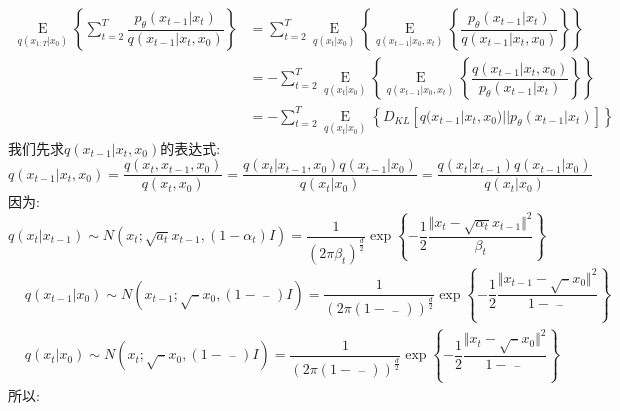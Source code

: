 \documentclass[withoutpreface,bwprint]{cumcmthesis} %
\begin{document}
		\begin{align*}
			\mathop{E}\limits_{ q(x_{1:T}|x_0) } \left\{  
			\sum_{t=2}^{T} \dfrac{p_{\theta}(x_{t-1}|x_{t})}{q(x_{t-1}|x_t,x_0)}
			\right\} & = 
			\sum_{t=2}^{T}
			\mathop{E}\limits_{ q(x_{t}|x_0) } \left\{
			\mathop{E}\limits_{ q(x_{t-1}|x_0,x_t) } \left\{  
			 \dfrac{p_{\theta}(x_{t-1}|x_{t})}{q(x_{t-1}|x_t,x_0)}
			\right\}
			\right\} 	\\
			& =
			- \sum_{t=2}^{T}
			\mathop{E}\limits_{ q(x_{t}|x_0) } \left\{
			\mathop{E}\limits_{ q(x_{t-1}|x_0,x_t) } \left\{  
			\dfrac{ q(x_{t-1}|x_t,x_0)}{p_{\theta}(x_{t-1}|x_{t})}
			\right\}
			\right\} 	\\
			& =	- \sum_{t=2}^{T}
			\mathop{E}\limits_{ q(x_{t}|x_0) } \left\{
				D_{KL}\left[ q(x_{t-1}|x_t,x_0)||p_{\theta}(x_{t-1}|x_{t})\right]
			\right\} 
		\end{align*}
	我们先求$q(x_{t-1}|x_t,x_0)$的表达式:
	$$
		q(x_{t-1}|x_t,x_0)=\dfrac{q(x_t,x_{t-1},x_0)}{q(x_t,x_0)}=\dfrac{q(x_t|x_{t-1},x_0) q(x_{t-1}|x_0)}{q(x_t|x_0)}=\dfrac{q(x_t|x_{t-1}) q(x_{t-1}|x_0)}{q(x_t|x_0)}
	$$
	因为:
	$$
	q(x_t|x_{t-1})  \sim N\left(x_t;\sqrt{a_t} x_{t-1},(1-\alpha_{t})I \right)=\dfrac{1}{\left( 2\pi\beta_{t} \right)^{\frac{d}{2}}} \exp
		\left\{ 
		-\dfrac{1}{2} \dfrac{\Vert x_t - \sqrt{\alpha_{t}}x_{t-1}\Vert^2}{\beta_{t}} 
		\right\}
	$$
	\begin{align*}
		& q(x_{t-1}|x_0)  \sim N\left( x_{t-1}; \sqrt{\mathop{\alpha_{t-1}}\limits^{-}} x_0,\left( 1-\mathop{\alpha_{t-1}}\limits^{-} \right) I \right)
		=\dfrac{1}{\left( 2\pi \left( 1-\mathop{\alpha_{t-1}}\limits^{-} \right) \right)^{\frac{d}{2}}}
		 \exp \left\{ -\dfrac{1}{2} \dfrac{\Vert x_{t-1} - \sqrt{\mathop{\alpha_{t-1}}\limits^{-}} x_0 \Vert^2}{ 1-\mathop{\alpha_{t-1}}\limits^{-} } \right\}
		 \\
		& q(x_t|x_0)  \sim N\left( x_t;\sqrt{\mathop{\alpha_t}\limits^{-}} x_0,\left( 1-\mathop{\alpha_t}\limits^{-} \right) I \right)
		=\dfrac{1}{\left( 2\pi \left( 1-\mathop{\alpha_{t}}\limits^{-} \right) \right)^{\frac{d}{2}}}
		\exp \left\{ -\dfrac{1}{2} \dfrac{\Vert x_{t} - \sqrt{\mathop{\alpha_{t}}\limits^{-}} x_0 \Vert^2}{ 1-\mathop{\alpha_{t}}\limits^{-} } \right\}
	\end{align*}
	所以:
\end{document}
